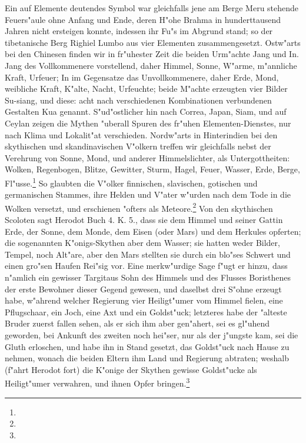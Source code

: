 \documentclass[a4paper, 11pt, oneside, polutonikogreek, german]{article}
\begin{document}
Ein auf Elemente deutendes Symbol war gleichfalls jene am Berge Meru stehende Feuers"aule ohne Anfang und Ende, deren H"ohe Brahma in hunderttausend Jahren nicht ersteigen konnte, indessen ihr Fu"s im Abgrund stand; so der tibetanische Berg Righiel Lumbo aus vier Elementen zusammengesetzt. Ostw"arts bei den Chinesen finden wir in fr"uhester Zeit die beiden Urm"achte Jang und In. Jang des Vollkommenere vorstellend, daher Himmel, Sonne, W"arme, m"annliche Kraft, Urfeuer; In im Gegensatze das Unvollkommenere, daher Erde, Mond, weibliche Kraft, K"alte, Nacht, Urfeuchte; beide M"achte erzeugten vier Bilder Su-siang, und diese: acht nach verschiedenen Kombinationen verbundenen Gestalten Kua genannt. S"ud"ostlicher hin nach Correa, Japan, Siam, und auf Ceylan zeigen die Mythen "uberall Spuren des fr"uhen Elementen-Dienstes, nur nach Klima und Lokalit"at verschieden. Nordw"arts in Hinterindien bei den skythischen und skandinavischen V"olkern treffen wir gleichfalls nebst der Verehrung von Sonne, Mond, und anderer Himmelslichter, als Untergottheiten: Wolken, Regenbogen, Blitze, Gewitter, Sturm, Hagel, Feuer, Wasser, Erde, Berge, Fl"usse.\footnote{} So glaubten die V"olker finnischen, slavischen, gotischen und germanischen Stammes, ihre Helden und V"ater w"urden nach dem Tode in die Wolken versetzt, und erschienen "ofters als Meteore.\footnote{} Von den skythischen Scoloten sagt Herodot Buch 4. K. 5., dass sie dem Himmel und seiner Gattin Erde, der Sonne, dem Monde, dem Eisen (oder Mars) und dem Herkules opferten; die sogenannten K"onigs-Skythen aber dem Wasser; sie hatten weder Bilder, Tempel, noch Alt"are, aber den Mars stellten sie durch ein blo"ses Schwert und einen gro"sen Haufen Rei"sig vor. Eine merkw"urdige Sage f"ugt er hinzu, dass n"amlich ein gewisser Targitaus Sohn des Himmels und des Flusses Boristhenes der erste Bewohner dieser Gegend gewesen, und daselbst drei S"ohne erzeugt habe, w"ahrend welcher Regierung vier Heiligt"umer vom Himmel fielen, eine Pflugschaar, ein Joch, eine Axt und ein Goldst"uck; letzteres habe der "alteste Bruder zuerst fallen sehen, als er sich ihm aber gen"ahert, sei es gl"uhend geworden, bei Ankunft des zweiten noch hei"ser, nur als der j"ungste kam, sei die Gluth erloschen, und habe ihn in Stand gesetzt, das Goldst"uck nach Hause zu nehmen, wonach die beiden Eltern ihm Land und Regierung abtraten; weshalb (f"ahrt Herodot fort) die K"onige der Skythen gewisse Goldst"ucke als Heiligt"umer verwahren, und ihnen Opfer bringen.\footnote{}
\end{document}
